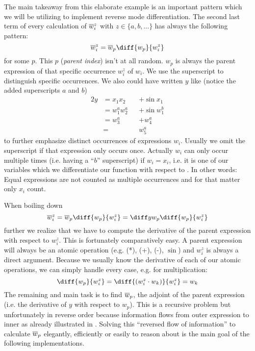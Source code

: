 The main takeaway from this elaborate \todowording example is an important pattern which we will be utilizing to implement reverse mode differentiation. The second last term of every calculation of $\overline{w}_{i}^z$ with $z \in \{a, b, ...\}$  has always the following pattern:
\newcommand{\defoverwiz}{\overw{i}^z = \overw{p}\diff{w_p}{w_i^z}}
\[ \defoverwiz \]
for some $p$. This $p$ (\emph{parent index}) isn't at all random. $w_p$ is always the parent expression of that specific occurrence $w_i^z$ of $w_i$. We use the superscript to distinguish specific occurrences. We also could have written $y$ like (notice the added superscripts $a$ and $b$)
\begin{alignat*}{2}
    y & = x_1x_2 &  & + \sin{x_1} \\
      & = w_1^a w_2^a &  & + \sin{w_1^b} \\
      & = w_3^a    &  & + w_4^a       \\
      & =        &  & w_5^a
\end{alignat*}
to further emphasize distinct occurrences of expressions $w_i$. Usually we omit the superscript if that expression only occurs once. Actually $w_i$ can only occur multiple times (i.e. having a ``$b$'' superscript) if $w_i = x_i$, i.e. it is one of our variables which we differentiate our function with respect to \todogrammar. In other words: Equal expressions are not counted as multiple occurrences and for that matter only $x_i$ count.

When boiling down
\[ \overw{i}^z = \overw{p}\diff{w_p}{w_i^z} = \diffyw{p}\diff{w_p}{w_i^z} \]
further we realize that we have to compute the derivative of the parent expression with respect to $w_i^z$. This is fortunately comparatively easy. A parent expression will always be an atomic operation (e.g. (*), (+), (-), $\sin$) and $w_i^z$ is always a direct argument. Because we usually know the derivative of each of our atomic operations, we can simply handle every case, e.g. for multiplication:
\[ \diff{w_p}{w_i^z} = \diff{(w_i^z \cdot w_k)}{w_i^z} = w_k \]
The remaining and main task is to find $\overline{w}_{p}$, \todopunctuation the adjoint of the parent expression (i.e. the derivative of $y$ with respect to $w_p$). This is a recursive problem but unfortunately in reverse order because information flows from outer expression to inner  as already illustrated in . Solving this ``reversed flow of information'' to calculate $\overline{w}_{p}$ elegantly, efficiently or easily to reason about is the main goal of the following implementations. 



